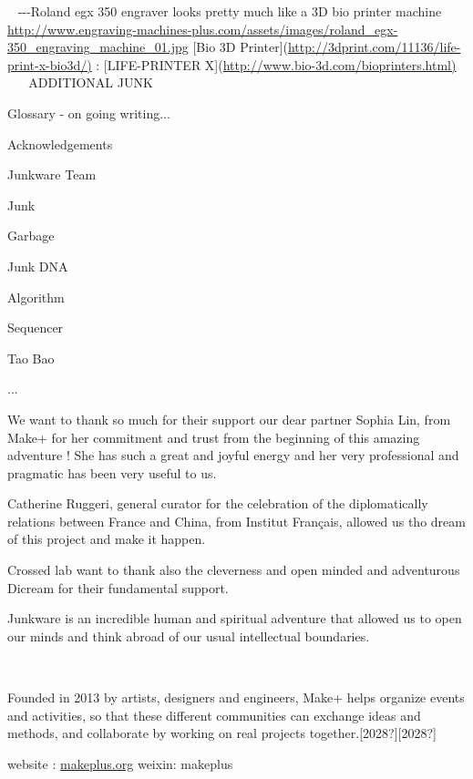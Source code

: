~
{}-{}-{}-Roland egx 350 engraver looks pretty much like a 3D bio printer
machine
\url{http://www.engraving-machines-plus.com/assets/images/roland_egx-350_engraving_machine_01.jpg}
[Bio 3D Printer](\url{http://3dprint.com/11136/life-print-x-bio3d/)} :
[LIFE-PRINTER X](\url{http://www.bio-3d.com/bioprinters.html)}
~
~
ADDITIONAL JUNK

 Glossary - on going writing...

 Acknowledgements

 Junkware Team

Junk~

Garbage

Junk DNA

Algorithm

Sequencer

Tao Bao

...


We want to thank so much for their support our dear partner Sophia Lin,
from Make+ for her commitment and trust from the beginning of this
amazing adventure ! She has such a great and joyful energy and her very
professional and pragmatic has been very useful to us.

Catherine Ruggeri, general curator for the celebration of the
diplomatically relations between France and China, from Institut
Fran\c{c}ais, allowed us tho dream of this project and make it happen.~

Crossed lab want to thank also the cleverness and open minded and
adventurous Dicream for their fundamental support.

Junkware is an incredible human and spiritual adventure that allowed us
to open our minds and think abroad of our usual intellectual
boundaries.

~

Founded in 2013 by artists, designers and engineers, Make+ helps
organize events and activities, so that these different communities can
exchange ideas and methods, and collaborate by working on real projects
together.[2028?][2028?]

website : \href{http://makeplus.org/}{makeplus.org}\newline
weixin: makeplus\newline
~

